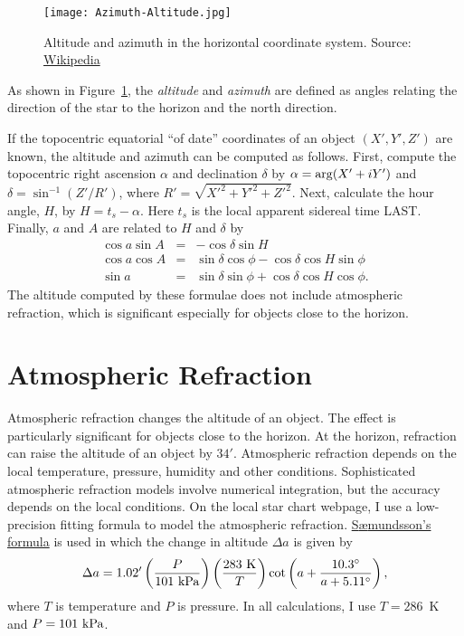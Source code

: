 \documentclass[12pt]{article}
\newcommand \beq {\begin{equation}}
\newcommand \eeq {\end{equation}}
\newcommand \beqn {\begin{eqnarray}}
\newcommand \eeqn {\end{eqnarray}}
\begin{document}
\begin{figure}[h]
\begin{center}
\texttt{[image: Azimuth-Altitude.jpg]}
\end{center}
\caption{Altitude and azimuth in the horizontal coordinate system.
Source: \href{https://en.wikipedia.org/wiki/Horizontal_coordinate_system}{Wikipedia}}
\label{fig:horizontal}
\end{figure}

As shown in Figure~\ref{fig:horizontal}, the {\em altitude} and {\em azimuth} 
are defined as angles relating the direction of the star to the horizon and 
the north direction.

If the topocentric equatorial ``of date'' coordinates of an object $(X',Y',Z')$ 
are known, the altitude and azimuth can be computed as follows. First, compute the 
topocentric right ascension $\alpha$ and declination $\delta$ by 
$\alpha = {\rm arg}(X' + i Y')$ and $\delta = \sin^{-1}(Z'/R')$, where 
$R'=\sqrt{X'^2+Y'^2+Z'^2}$.
Next, calculate the hour angle, $H$, by $H=t_s-\alpha$. Here $t_s$ 
is the local apparent sidereal time LAST. 
Finally, $a$ and $A$ are related to $H$ and $\delta$ by 
\beqn
  \cos a \sin A &=& -\cos \delta \sin H \label{eq:aAFromHdel1} \\
  \cos a \cos A &=& \sin \delta \cos \phi - \cos \delta \cos H \sin \phi 
\label{eq:aAFromHdel2} \\
  \sin a &=& \sin \delta \sin \phi + \cos \delta \cos H \cos \phi .
\label{eq:aAFromHdel3}
\eeqn
The altitude computed by these formulae does not include atmospheric refraction, 
which is significant especially for objects close to the horizon.

\section{Atmospheric Refraction}

Atmospheric refraction changes the altitude of an object. The effect is particularly 
significant for objects close to the horizon. At the horizon, refraction 
can raise the altitude of an object by $34'$. Atmospheric refraction 
depends on the local temperature, pressure, humidity and other conditions. 
Sophisticated atmospheric refraction models involve numerical integration, 
but the accuracy depends on the local conditions.
On the local star chart webpage, I use a low-precision fitting formula 
to model the atmospheric refraction. 
\href{https://en.wikipedia.org/wiki/Atmospheric_refraction#cite_note-Saemundsson1986-24}{S{\ae}mundsson's formula} 
is used in which the change in altitude $\Delta a$ is given by 
\beq
  \Delta a = 1.02' \left(\frac{P}{101~{\rm kPa}}\right) 
\left( \frac{283~{\rm K}}{T}\right)  
\cot \left(a + \frac{10.3^\circ}{a + 5.11^\circ}\right) ,
\label{eq:atmRefraction}
\eeq
where $T$ is temperature and $P$ is pressure. In all calculations, 
I use $T=286$~K and $P=101~{\rm kPa}$.
\end{document}
